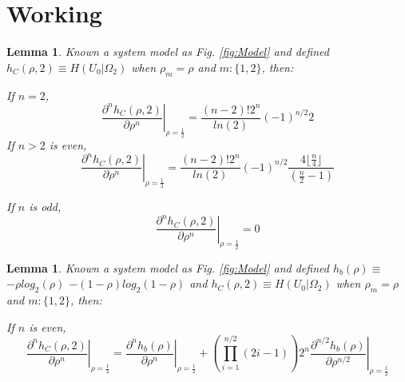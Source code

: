 \documentclass[a4paper,10pt]{article}
\newtheorem{mylemma}[mytheorem]{Lemma}
\begin{document}
\section{Working}
\label{sec:working}
\begin{mdframed}[style=MDFStyGrayScreen]
\begin{mylemma}
 \label{lemm:Dnh0Omega2all}
 Known a system model as Fig. \ref{fig:Model} and defined 
 $h_{C}(\rho,2)\equiv H(U_0|\Omega_2)$ when $\rho_m=\rho$ and $m:\{1,2\}$, then:
 
 If $n=2$,
 \begin{equation}\label{eq:Dnh0Omega2all_0}
\left. \frac{\partial^n  h_{C}(\rho,2)}{\partial \rho^n}\right|_{\rho=\frac{1}{2}} = 
\frac{(n-2)! 2^n }{ln(2)}
(-1)^{n/2}2
\end{equation}
 If $n>2$ is even,
\begin{equation}\label{eq:Dnh0Omega2all_1}
\left. \frac{\partial^n  h_{C}(\rho,2)}{\partial \rho^n}\right|_{\rho=\frac{1}{2}} = 
\frac{(n-2)! 2^n }{ln(2)}
(-1)^{n/2}
\frac{4\lfloor \frac{n}{4} \rfloor  }{\left(\frac{n}{2}-1\right)}
\end{equation}
 
 If $n$ is odd,
\begin{equation}\label{eq:Dnh0Omega2all_2}
\left. \frac{\partial^n  h_{C}(\rho,2)}{\partial \rho^n}\right|_{\rho=\frac{1}{2}} = 0
\end{equation}
\end{mylemma}
\end{mdframed}

\begin{mdframed}[style=MDFStyGrayScreen]
\begin{mylemma}
 \label{lemm:Dnh0Omega2}
 Known a system model as Fig. \ref{fig:Model} and defined $h_{b}(\rho) \equiv$ 
 $-\rho log_2(\rho)$ $-(1-\rho) log_2(1-\rho)$ and 
 $h_{C}(\rho,2)\equiv H(U_0|\Omega_2)$ when $\rho_m=\rho$ and $m:\{1,2\}$, then:
 
 If $n$ is even,
\begin{equation}\label{eq:Dnh0Omega2_1}
\left. \frac{\partial^n  h_{C}(\rho,2)}{\partial \rho^n}\right|_{\rho=\frac{1}{2}} =
\left. \frac{\partial^n  h_{b}(\rho)}{\partial \rho^n}\right|_{\rho=\frac{1}{2}} +
\left( \prod_{i=1}^{n/2}(2i-1)\right) 2^{n}\left. \frac{\partial^{n/2}  h_{b}(\rho)}{\partial \rho^{n/2}}\right|_{\rho=\frac{1}{2}}
\end{equation}
\end{mylemma}
\end{mdframed}
\end{document}
